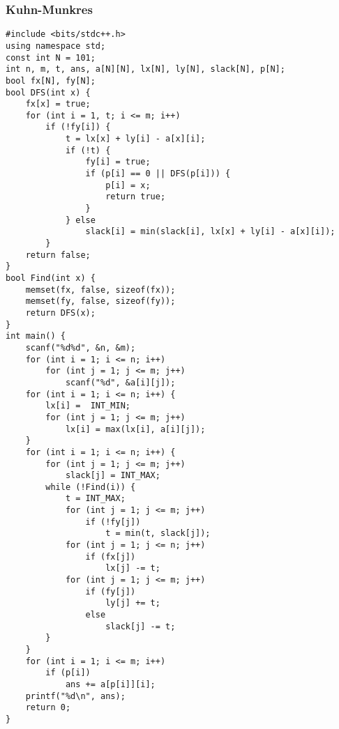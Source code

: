 ﻿\documentclass[a4paper]{article}
\begin{document}
\subsubsection{Kuhn-Munkres}
\begin{lstlisting}
#include <bits/stdc++.h>
using namespace std;
const int N = 101;
int n, m, t, ans, a[N][N], lx[N], ly[N], slack[N], p[N];
bool fx[N], fy[N];
bool DFS(int x) {
    fx[x] = true;
    for (int i = 1, t; i <= m; i++)
        if (!fy[i]) {
            t = lx[x] + ly[i] - a[x][i];
            if (!t) {
                fy[i] = true;
                if (p[i] == 0 || DFS(p[i])) {
                    p[i] = x;
                    return true;
                }
            } else
                slack[i] = min(slack[i], lx[x] + ly[i] - a[x][i]);
        }
    return false;
}
bool Find(int x) {
    memset(fx, false, sizeof(fx));
    memset(fy, false, sizeof(fy));
    return DFS(x);
}
int main() {
    scanf("%d%d", &n, &m);
    for (int i = 1; i <= n; i++)
        for (int j = 1; j <= m; j++)
            scanf("%d", &a[i][j]);
    for (int i = 1; i <= n; i++) {
        lx[i] =  INT_MIN;
        for (int j = 1; j <= m; j++)
            lx[i] = max(lx[i], a[i][j]);
    }
    for (int i = 1; i <= n; i++) {
        for (int j = 1; j <= m; j++)
            slack[j] = INT_MAX;
        while (!Find(i)) {
            t = INT_MAX;
            for (int j = 1; j <= m; j++)
                if (!fy[j])
                    t = min(t, slack[j]);
            for (int j = 1; j <= n; j++)
                if (fx[j])
                    lx[j] -= t;
            for (int j = 1; j <= m; j++)
                if (fy[j])
                    ly[j] += t;
                else
                    slack[j] -= t;
        }
    }
    for (int i = 1; i <= m; i++)
        if (p[i])
            ans += a[p[i]][i];
    printf("%d\n", ans);
    return 0;
}
\end{lstlisting}
\end{document}
